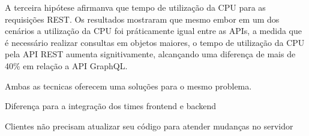 A terceira hipótese afirmanva que tempo de utilização da CPU para as requisições REST. Os resultados mostraram que mesmo embor em um dos cenários a utilização da CPU foi práticamente igual entre as APIs, a medida que é necessário realizar consultas em objetos maiores, o tempo de utilização da CPU pela API REST aumenta signitivamente, alcançando uma diferença de mais de 40\% em relação a API GraphQL. 

Ambas as tecnicas oferecem uma soluções para o mesmo problema.

Diferença para a integração dos times frontend e backend

Clientes não precisam atualizar seu código para atender mudanças no servidor

\lipsum[31-33]
